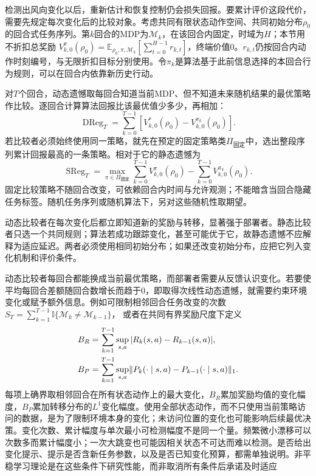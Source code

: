 检测出风向变化以后，重新估计和恢复控制仍会损失回报。要累计评价这段代价，需要先规定每次变化后的比较对象。考虑共同有限状态动作空间、共同初始分布$\rho_0$的回合式任务序列。第$k$回合的MDP为$\mathcal M_k$，在该回合内固定，时域为$H$；本节用不折扣总奖励
$V_{k,0}^{\pi}(\rho_0)=\mathbb E_{\rho_0,\pi,\mathcal M_k}
[\sum_{t=0}^{H-1}r_{k,t}]$，终端价值0。$r_{k,t}$仍按回合内动作时刻编号，与无限折扣目标分别使用。令$\pi_k$是算法基于此前信息选择的本回合行为规则，可以在回合内依靠新历史行动。

\begin{definition}[动态遗憾与静态遗憾]
 \label{def:rl-transfer-regret}
 对$T$个回合，动态遗憾取每回合知道当前MDP、但不知道未来随机结果的最优策略作比较。逐回合计算算法回报比该最优值少多少，再相加：
 \begin{equation}
 \operatorname{DReg}_T
 =\sum_{k=0}^{T-1}\left[
 V_{k,0}^{*}(\rho_0)-V_{k,0}^{\pi_k}(\rho_0)\right].
 \label{eq:rl-transfer-dynamic-regret}
 \end{equation}
 若比较者必须始终使用同一策略，就先在预定的固定策略类$\Pi_{\text{固定}}$中，选出整段序列累计回报最高的一条策略。相对于它的静态遗憾为
 \begin{equation}
 \operatorname{SReg}_T
 =\max_{\pi\in\Pi_{\text{固定}}}
       \sum_{k=0}^{T-1}V_{k,0}^{\pi}(\rho_0)
       -\sum_{k=0}^{T-1}V_{k,0}^{\pi_k}(\rho_0).
 \label{eq:rl-transfer-static-regret}
 \end{equation}
 固定比较策略不随回合改变，可依赖回合内时间与允许观测；不能暗含当回合隐藏任务标签。随机任务序列或随机算法下，另对这些随机性取期望。
\end{definition}

动态比较者在每次变化后都立即知道新的奖励与转移，显著强于部署者。静态比较者只选一个共同规则；算法若成功跟踪变化，甚至可能优于它，故静态遗憾不应解释为适应延迟。两者必须使用相同初始分布；如果还改变初始分布，应把它列入变化机制和评价条件。

动态比较者每回合都能换成当前最优策略，而部署者需要从反馈认识变化。若要使平均每回合差额随回合数增长而趋于0，即取得次线性动态遗憾，就需要约束环境变化或赋予额外信息。例如可限制相邻回合任务改变的次数
$S_T=\sum_{k=1}^{T-1}\mathbb I\{\mathcal M_k\ne\mathcal M_{k-1}\}$，
或者在共同有界奖励尺度下定义
\begin{align}
 B_R&=\sum_{k=1}^{T-1}\sup_{s,a}|R_k(s,a)-R_{k-1}(s,a)|,\notag\\
 B_P&=\sum_{k=1}^{T-1}\sup_{s,a}
 \lVert P_k(\cdot\mid s,a)-P_{k-1}(\cdot\mid s,a)\rVert_1.
 \label{eq:rl-transfer-variation}
\end{align}
每项上确界取相邻回合在所有状态动作上的最大变化，$B_R$累加奖励均值的变化幅度，$B_P$累加转移分布的$L^1$变化幅度。使用全部状态动作，而不只使用当前策略访问的数据，是为了限制环境本身的变化；未访问位置的变化也可能影响后续最优决策。变化次数、累计幅度与单次最小可检测幅度不是同一个量。频繁微小漂移可以次数多而累计幅度小；一次大跳变也可能因相关状态不可达而难以检测。是否给出变化提示、提示是否含新任务参数，以及是否已知变化预算，都需单独说明。非平稳学习理论是在这些条件下研究性能，而非取消所有条件后承诺及时适应

